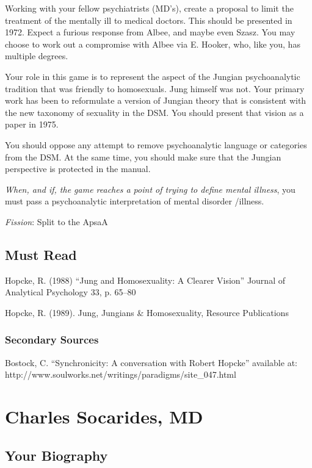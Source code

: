 \begin{refsection}
Working with your fellow psychiatrists (MD's), create a proposal to limit the treatment of the mentally ill to medical doctors. This should be presented in 1972. Expect a furious response from Albee, and maybe even Szasz. You may choose to work out a compromise with Albee via E. Hooker, who, like you, has multiple degrees.

Your role in this game is to represent the aspect of the Jungian psychoanalytic tradition that was friendly to homosexuals. Jung himself was not. Your primary work has been to reformulate a version of Jungian theory that is consistent with the new taxonomy of sexuality in the DSM. You should present that vision as a paper in 1975.

You should oppose any attempt to remove psychoanalytic language or categories from the DSM. At the same time, you should make sure that the Jungian perspective is protected in the manual.

\emph{When, and if, the game reaches a point of trying to define mental illness}, you must pass a psychoanalytic interpretation of mental disorder \slash  illness.

\emph{Fission}: Split to the ApsaA

\section{Must Read}
\label{mustread}

Hopcke, R. (1988) ``Jung and Homosexuality: A Clearer Vision'' Journal of Analytical Psychology 33, p. 65--80

Hopcke, R. (1989). Jung, Jungians \& Homosexuality, Resource Publications

\subsection{Secondary Sources}
\label{secondarysources}

Bostock, C. ``Synchronicity: A conversation with Robert Hopcke'' available at: http:\slash \slash www.soulworks.net\slash writings\slash paradigms\slash site\_047.html

\chapter{Charles Socarides, MD}
\label{charlessocaridesmd}

\section{Your Biography}
\label{yourbiography}


\end{refsection}
